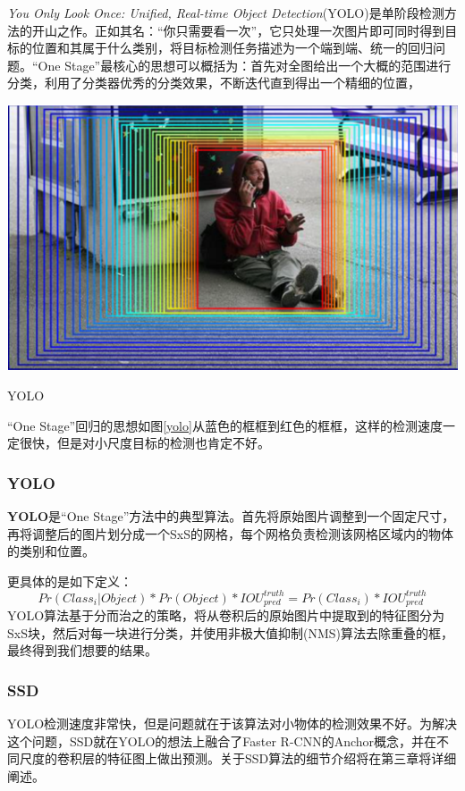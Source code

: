 \textit{You Only Look Once: Unified, Real-time Object Detection}(YOLO)\cite{yolo}是单阶段检测方法的开山之作。正如其名：“你只需要看一次”，它只处理一次图片即可同时得到目标的位置和其属于什么类别，将目标检测任务描述为一个端到端、统一的回归问题。“One Stage”最核心的思想可以概括为：首先对全图给出一个大概的范围进行分类，利用了分类器优秀的分类效果，不断迭代直到得出一个精细的位置，
\begin{uscfigure}
	\includegraphics[width=\textwidth]{./Pictures/od_regressor.png}	
	\caption{YOLO}
	\label{yolo}
\end{uscfigure}
“One Stage”回归的思想如图\ref{yolo}从蓝色的框框到红色的框框，这样的检测速度一定很快，但是对小尺度目标的检测也肯定不好。

\subsubsection{YOLO}
\textbf{YOLO}是“One Stage”方法中的典型算法。首先将原始图片调整到一个固定尺寸，再将调整后的图片划分成一个SxS的网格，每个网格负责检测该网格区域内的物体的类别和位置。

更具体的是如下定义：
\begin{equation}
	Pr(Class_i | Object) * Pr(Object) * IOU_{pred}^{truth} = Pr(Class_i) * IOU_{pred}^{truth}
\end{equation}
YOLO算法基于分而治之的策略，将从卷积后的原始图片中提取到的特征图分为SxS块，然后对每一块进行分类，并使用非极大值抑制(NMS\cite{nms})算法去除重叠的框，最终得到我们想要的结果。
\subsubsection{SSD}
YOLO检测速度非常快，但是问题就在于该算法对小物体的检测效果不好。为解决这个问题，SSD就在YOLO的想法上融合了Faster R-CNN的Anchor概念，并在不同尺度的卷积层的特征图上做出预测。关于SSD算法的细节介绍将在第三章将详细阐述。
